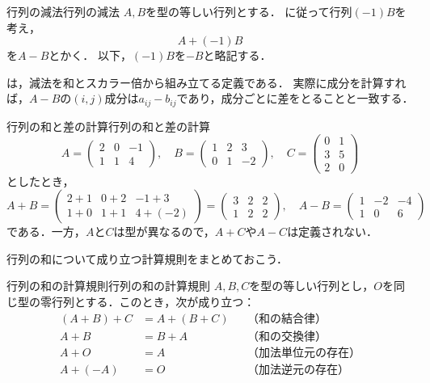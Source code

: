 \begin{definition}{行列の減法}{行列の減法}
  $A,B$を型の等しい行列とする．
  に従って行列$(-1)B$を考え，
  \[
    A + (-1)B
  \]
  を$A - B$とかく．
  以下，$(-1)B$を$-B$と略記する．
\end{definition}

は，減法を和とスカラー倍から組み立てる定義である．
実際に成分を計算すれば，$A - B$の$(i, j)$成分は$a_{ij} - b_{ij}$であり，成分ごとに差をとることと一致する．

\begin{example}{行列の和と差の計算}{行列の和と差の計算}
  \[
    A = \begin{pmatrix} 2 & 0 & -1 \\ 1 & 1 & 4 \end{pmatrix}, \quad
    B = \begin{pmatrix} 1 & 2 & 3 \\ 0 & 1 & -2 \end{pmatrix}, \quad
    C = \begin{pmatrix} 0 & 1 \\ 3 & 5 \\ 2 & 0 \end{pmatrix}
  \]
  としたとき，
  \[
    A + B =
    \begin{pmatrix}
      2 + 1 & 0 + 2 & -1 + 3 \\
      1 + 0 & 1 + 1 & 4 + (-2)
    \end{pmatrix}
    =
    \begin{pmatrix}
      3 & 2 & 2 \\
      1 & 2 & 2
    \end{pmatrix}, \quad
    A - B =
    \begin{pmatrix}
      1 & -2 & -4 \\
      1 & 0 & 6
    \end{pmatrix}
  \]
  \tcbbreak
  \noindent 
  である．一方，$A$と$C$は型が異なるので，$A + C$や$A - C$は定義されない．
\end{example}

行列の和について成り立つ計算規則をまとめておこう．

\begin{prop}{行列の和の計算規則}{行列の和の計算規則}
  $A,B,C$を型の等しい行列とし，$O$を同じ型の零行列とする．このとき，次が成り立つ：
  \begin{align*}
    (A + B) + C &= A + (B + C) && \text{（和の結合律）} \\
    A + B &= B + A && \text{（和の交換律）} \\
    A + O &= A && \text{（加法単位元の存在）} \\
    A + (-A) &= O && \text{（加法逆元の存在）}
  \end{align*}
\end{prop}

